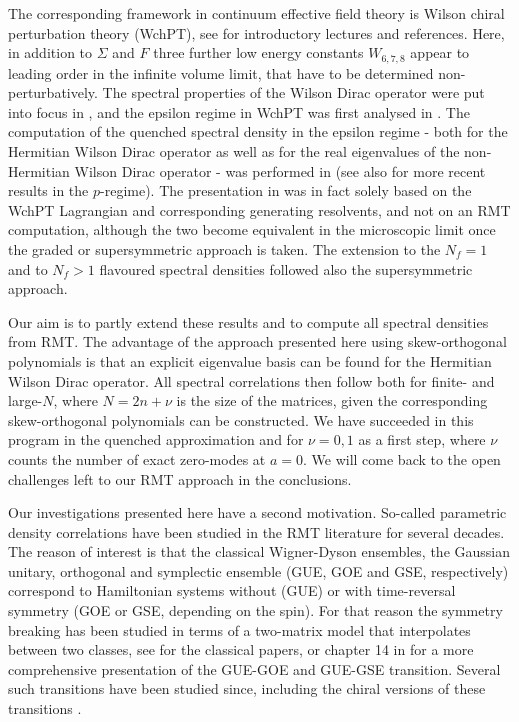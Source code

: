 \documentclass[11pt]{article}
\begin{document}
The corresponding framework in continuum effective field theory is
Wilson chiral perturbation theory (WchPT), see \cite{GS} for
introductory lectures and references.
Here, in addition to $\Sigma$ and $F$ three further low energy constants
$W_{6,7,8}$ appear to leading order in the infinite volume limit, that
have to be determined non-perturbatively. 
The spectral properties of the Wilson Dirac operator
were put into focus in \cite{Sharpe2006},
and the epsilon regime in WchPT was first analysed in
\cite{Shindler}. The computation of the quenched spectral
density in the epsilon regime - both 
for the Hermitian Wilson Dirac operator as well as for the
real eigenvalues of the non-Hermitian Wilson Dirac operator -
was performed in \cite{DSV} (see also \cite{SN} for more recent results in
the $p$-regime).  The presentation 
in \cite{DSV,ADSV} was in fact solely based on the WchPT Lagrangian
and corresponding generating resolvents, and not on an RMT computation,
although the two become equivalent in the microscopic limit once the
graded or supersymmetric approach is taken. The extension to the
$N_f=1$ \cite{ADSVLatNf} and to $N_f>1$ \cite{SV2011} 
flavoured spectral densities followed also the
supersymmetric approach. 

Our aim is to partly extend these results 
and to compute all spectral densities
from RMT. The advantage of the approach presented here using
skew-orthogonal polynomials is that an explicit eigenvalue basis can
be  found for the Hermitian Wilson Dirac operator. All spectral correlations
then follow both for finite- and large-$N$, where $N=2n+\nu$ is the
size of the matrices, given the corresponding
skew-orthogonal polynomials can be constructed. We have succeeded in this
program in the quenched approximation and for $\nu=0,1$ as a first step,
where $\nu$ counts the number of exact zero-modes at $a=0$.
We will come back to the open challenges left to our RMT approach in the
conclusions. 

Our investigations presented here have a second motivation. So-called
parametric density correlations have been studied in the RMT
literature for several decades. The reason of interest is that the
classical Wigner-Dyson ensembles, the Gaussian unitary, orthogonal
and symplectic ensemble (GUE, GOE and GSE, respectively) correspond to
Hamiltonian systems without (GUE) or with time-reversal symmetry (GOE
or GSE, depending on the spin). For that
reason the symmetry breaking has been studied 
in terms of a two-matrix model that
interpolates between two classes, see
\cite{PandeyMehta} for the classical papers, or chapter 14 in \cite{Mehta} for a
more comprehensive presentation of the GUE-GOE and GUE-GSE 
transition. 
Several such transitions have been studied
since, including the chiral versions of these transitions \cite{FHN}.
\end{document}
